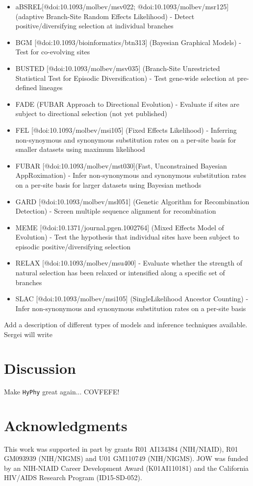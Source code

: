\documentclass[nogrid]{MBE}%
\newcommand{\revised}[1]{{\color{red}#1}}
\newcommand{\hyphy}{{\tt HyPhy}}
\begin{document}
\begin{itemize}
 \item
aBSREL[@doi:10.1093/molbev/msv022; @doi:10.1093/molbev/msr125] (adaptive Branch-Site Random Effects Likelihood) - Detect positive/diversifying selection at individual branches  
 \item 
BGM [@doi:10.1093/bioinformatics/btn313] (Bayesian Graphical Models) - Test for co-evolving sites  
 \item
 BUSTED [@doi:10.1093/molbev/msv035] (Branch-Site Unrestricted Statistical Test for Episodic Diversification) - Test gene-wide selection at pre-defined lineages  
 \item
 FADE (FUBAR Approach to Directional Evolution) - Evaluate if sites are subject to directional selection (not yet published) 
 \item
 FEL [@doi:10.1093/molbev/msi105] (Fixed Effects Likelihood) - Inferring non-synoymous and synonymous substitution rates on a per-site basis for smaller datasets using maximum likelihood  
 \item
 FUBAR [@doi:10.1093/molbev/mst030](Fast, Unconstrained Bayesian AppRoximation) - Infer non-synonymous and synonymous substitution rates on a per-site basis for larger datasets using Bayesian methods  
 \item
 GARD [@doi:10.1093/molbev/msl051] (Genetic Algorithm for Recombination Detection) - Screen multiple sequence alignment for recombination  
 \item
 MEME [@doi:10.1371/journal.pgen.1002764] (Mixed Effects Model of Evolution) - Test the hypothesis that individual sites have been subject to episodic positive/diversifying selection  
 \item
 RELAX  [@doi:10.1093/molbev/msu400] - Evaluate whether the strength of natural selection has been relaxed or intensified along a specific set of branches  
 \item
 SLAC [@doi:10.1093/molbev/msi105] (SingleLikelihood Ancestor Counting) - Infer non-synonymous and synonymous substitution rates on a per-site basis 
\end{itemize}


Add a description of different types of models and inference techniques
available. \revised{Sergei will write}


\section{Discussion}

Make \hyphy{} great again... COVFEFE!

\section{Acknowledgments}

This work was supported in part by grants R01 AI134384 (NIH/NIAID), R01 GM093939
(NIH/NIGMS) and U01 GM110749 (NIH/NIGMS). JOW was funded by an NIH-NIAID Career
Development Award (K01AI110181) and the California HIV/AIDS Research Program
(ID15-SD-052). 

\end{document}
